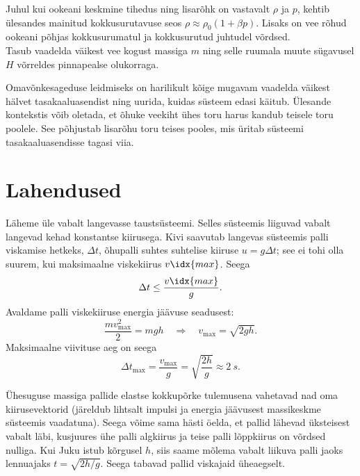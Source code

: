 \documentclass[10pt]{article}
\begin{document}
{
\hint
\osa Juhul kui ookeani keskmine tihedus ning lisarõhk on vastavalt $\rho$ ja $p$, kehtib ülesandes mainitud kokkusurutavuse seos $\rho \approx \rho_0 ( 1 + \beta p)$. Lisaks on vee rõhud ookeani põhjas kokkusurumatul ja kokkusurutud juhtudel võrdsed.\\
\osa Tasub vaadelda väikest vee kogust massiga $m$ ning selle ruumala muute sügavusel $H$ võrreldes pinnapealse olukorraga.
\probend
\bigskip


\hint
Omavõnkesageduse leidmiseks on harilikult kõige mugavam vaadelda väikest hälvet tasakaaluasendist ning uurida, kuidas süsteem edasi käitub. Ülesande kontekstis võib oletada, et õhuke veekiht ühes toru harus kandub teisele toru poolele. See põhjustab lisarõhu toru teises pooles, mis üritab süsteemi tasakaaluasendisse tagasi viia.
\probend
\bigskip
\newpage\section{Lahendused}
        \toggleSolution
        

\solu
Läheme üle vabalt langevasse taustsüsteemi. Selles süsteemis liiguvad vabalt langevad kehad konstantse kiirusega. Kivi saavutab langevas süsteemis palli viskamise hetkeks, $\Delta t$, õhupalli suhtes suhtelise kiiruse $u = g\Delta t$; see ei tohi olla suurem, kui maksimaalne viskekiirus $v\idx{max}$. Seega
\[
\Delta t \leq \frac{v\idx{max}}{g}.
\]
Avaldame palli viskekiiruse energia jäävuse seadusest:
\[
\frac{m v_{\max }^{2}}{2}=m g h \quad \Rightarrow \quad v_{\max }=\sqrt{2 g h}.
\]
Maksimaalne viivituse aeg on seega
\[
\Delta t_{\max }=\frac{v_{\max }}{g}=\sqrt{\frac{2 h}{g}} \approx \SI{2}{s}.
\]
\probend
\bigskip


\solu
Ühesuguse massiga pallide elastse kokkupõrke tulemusena vahetavad nad oma
kiirusevektorid (järeldub lihtsalt impulsi ja energia jäävusest massikeskme süsteemis vaadatuna). Seega võime sama hästi öelda, et pallid lähevad üksteisest vabalt läbi, kusjuures ühe palli algkiirus ja teise palli lõppkiirus on võrdsed nulliga. Kui Juku istub kõrgusel $h$, siis saame mõlema vabalt liikuva palli jaoks lennuajaks $t = \sqrt{2h/g}$. Seega tabavad pallid viskajaid üheaegselt. 

}
\end{document}
